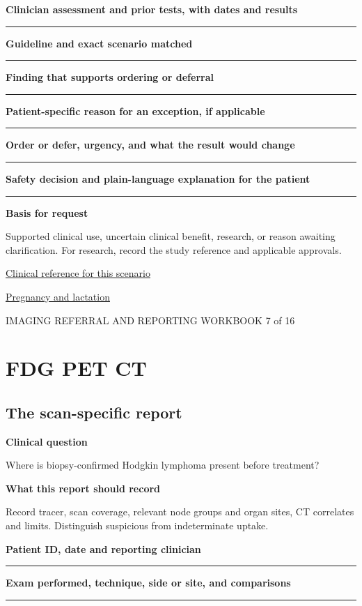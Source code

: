 \documentclass[11pt,a4paper]{article}
\newcommand{\record}[1]{\textbf{#1}\par\vspace{0.55\baselineskip}\hrule\vspace{0.35\baselineskip}}
\begin{document}
\record{Clinician assessment and prior tests, with dates and results}

\record{Guideline and exact scenario matched}

\record{Finding that supports ordering or deferral}

\record{Patient-specific reason for an exception, if applicable}

\record{Order or defer, urgency, and what the result would change}

\record{Safety decision and plain-language explanation for the patient}

\textbf{Basis for request}\par Supported clinical use, uncertain clinical benefit, research, or reason awaiting clarification. For research, record the study reference and applicable approvals.\par

\small\href{https://pmc.ncbi.nlm.nih.gov/articles/12165998/}{Clinical reference for this scenario}

\quad\href{https://pubmed.ncbi.nlm.nih.gov/28937575/}{Pregnancy and lactation}

\normalsize

\newpage

{\small IMAGING REFERRAL AND REPORTING WORKBOOK \hfill 7 of 16}

\section*{FDG PET CT}

\subsection*{The scan-specific report}

\textbf{Clinical question}\par Where is biopsy-confirmed Hodgkin lymphoma present before treatment?\par

\textbf{What this report should record}\par Record tracer, scan coverage, relevant node groups and organ sites, CT correlates and limits. Distinguish suspicious from indeterminate uptake.\par

\record{Patient ID, date and reporting clinician}

\record{Exam performed, technique, side or site, and comparisons}
\end{document}
